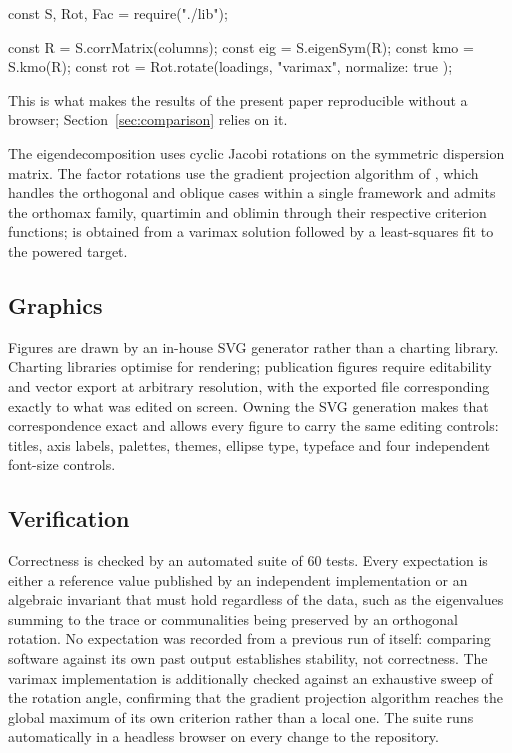 \documentclass[article]{jss}
\begin{document}
\begin{Code}
const { S, Rot, Fac } = require("./lib");

const R = S.corrMatrix(columns);
const eig = S.eigenSym(R);
const kmo = S.kmo(R);
const rot = Rot.rotate(loadings, "varimax", { normalize: true });
\end{Code}

This is what makes the results of the present paper reproducible without a browser;
Section~\ref{sec:comparison} relies on it.

The eigendecomposition uses cyclic Jacobi rotations on the symmetric dispersion
matrix. The factor rotations use the gradient projection algorithm of
\citet{jennrich2001, jennrich2002}, which handles the orthogonal and oblique cases
within a single framework and admits the orthomax family, quartimin and oblimin
through their respective criterion functions; 
\citep{hendrickson1964} is obtained from a varimax solution followed by a
least-squares fit to the powered target.

\subsection{Graphics}

Figures are drawn by an in-house SVG generator rather than a charting library.
Charting libraries optimise for rendering; publication figures require editability
and vector export at arbitrary resolution, with the exported file corresponding
exactly to what was edited on screen. Owning the SVG generation makes that
correspondence exact and allows every figure to carry the same editing controls:
titles, axis labels, palettes, themes, ellipse type, typeface and four independent
font-size controls.

\subsection{Verification}

Correctness is checked by an automated suite of 60 tests. Every expectation is
either a reference value published by an independent implementation or an
algebraic invariant that must hold regardless of the data, such as the eigenvalues
summing to the trace or communalities being preserved by an orthogonal rotation.
No expectation was recorded from a previous run of  itself: comparing
software against its own past output establishes stability, not correctness. The
varimax implementation is additionally checked against an exhaustive sweep of the
rotation angle, confirming that the gradient projection algorithm reaches the
global maximum of its own criterion rather than a local one. The suite runs
automatically in a headless browser on every change to the repository.
\end{document}
